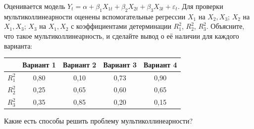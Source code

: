 Оценивается модель $Y_t = \alpha + \beta_1X_{1t} + \beta_2X_{2t} +
\beta_3X_{3t} + \varepsilon_t$. Для проверки мультиколлинеарности оценены
вспомогательные регрессии $X_1$ на $X_2, X_3$; $X_2$ на $X_1, X_3$; $X_3$ на
$X_1, X_2$ с коэффициентами детерминации $R_1^2$, $R_2^2$, $R_3^2$. Объясните,
что такое мультиколлинеарность, и сделайте вывод о её наличии для каждого
варианта:
\begin{center}
\begin{tabular}{ccccc}
\toprule
 & Вариант 1 & Вариант 2 & Вариант 3 & Вариант 4 \\
\midrule
$R_1^2$ & 0,80 & 0,10 & 0,73 & 0,90 \\
$R_2^2$ & 0,25 & 0,65 & 0,60 & 0,65 \\
$R_3^2$ & 0,35 & 0,85 & 0,20 & 0,15 \\
\bottomrule
\end{tabular}
\end{center}
Какие есть способы решить проблему мультиколлинеарности?

